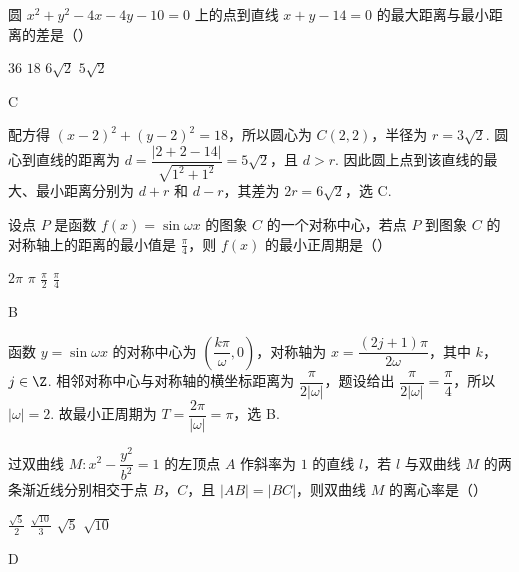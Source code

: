 \begin{problem}
圆 \(x^2+y^2-4x-4y-10=0\) 上的点到直线 \(x+y-14=0\) 的最大距离与最小距离的差是（\quad）

\choices
    {\(36\)}
    {\(18\)}
    {\(6\sqrt{2}\)}
    {\(5\sqrt{2}\)}
\end{problem}

\begin{answer}
C
\end{answer}

\begin{solution}
配方得 \((x-2)^2+(y-2)^2=18\)，所以圆心为 \(C(2,2)\)，半径为 \(r=3\sqrt{2}\). 圆心到直线的距离为 \(d=\dfrac{|2+2-14|}{\sqrt{1^2+1^2}}=5\sqrt{2}\)，且 \(d>r\). 因此圆上点到该直线的最大、最小距离分别为 \(d+r\) 和 \(d-r\)，其差为 \(2r=6\sqrt{2}\)，选 C.
\end{solution}

\begin{problem}
设点 \(P\) 是函数 \(f(x)=\sin\omega x\) 的图象 \(C\) 的一个对称中心，若点 \(P\) 到图象 \(C\) 的对称轴上的距离的最小值是 \(\frac{\pi}{4}\)，则 \(f(x)\) 的最小正周期是（\quad）

\choices
    {\(2\pi\)}
    {\(\pi\)}
    {\(\frac{\pi}{2}\)}
    {\(\frac{\pi}{4}\)}
\end{problem}

\begin{answer}
B
\end{answer}

\begin{solution}
函数 \(y=\sin\omega x\) 的对称中心为 \(\left(\dfrac{k\pi}{\omega},0\right)\)，对称轴为 \(x=\dfrac{(2j+1)\pi}{2\omega}\)，其中 \(k\)，\(j\in\Z\). 相邻对称中心与对称轴的横坐标距离为 \(\dfrac{\pi}{2|\omega|}\)，题设给出 \(\dfrac{\pi}{2|\omega|}=\dfrac{\pi}{4}\)，所以 \(|\omega|=2\). 故最小正周期为 \(T=\dfrac{2\pi}{|\omega|}=\pi\)，选 B.
\end{solution}

\begin{problem}
过双曲线 \(M:x^2-\dfrac{y^2}{b^2}=1\) 的左顶点 \(A\) 作斜率为 \(1\) 的直线 \(l\)，若 \(l\) 与双曲线 \(M\) 的两条渐近线分别相交于点 \(B\)，\(C\)，且 \(|AB|=|BC|\)，则双曲线 \(M\) 的离心率是（\quad）

\choices
    {\(\frac{\sqrt{5}}{2}\)}
    {\(\frac{\sqrt{10}}{3}\)}
    {\(\sqrt{5}\)}
    {\(\sqrt{10}\)}
\end{problem}

\begin{answer}
D
\end{answer}

